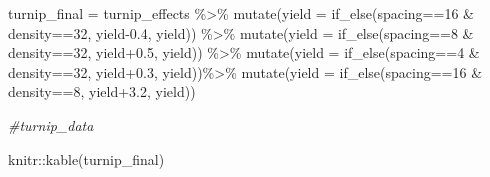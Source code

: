 \documentclass[
]{book}
\newenvironment{Shaded}{\begin{snugshade}}{\end{snugshade}}
\newcommand{\AttributeTok}[1]{\textcolor[rgb]{0.77,0.63,0.00}{#1}}
\newcommand{\CommentTok}[1]{\textcolor[rgb]{0.56,0.35,0.01}{\textit{#1}}}
\newcommand{\DecValTok}[1]{\textcolor[rgb]{0.00,0.00,0.81}{#1}}
\newcommand{\FloatTok}[1]{\textcolor[rgb]{0.00,0.00,0.81}{#1}}
\newcommand{\FunctionTok}[1]{\textcolor[rgb]{0.00,0.00,0.00}{#1}}
\newcommand{\NormalTok}[1]{#1}
\newcommand{\OtherTok}[1]{\textcolor[rgb]{0.56,0.35,0.01}{#1}}
\newcommand{\SpecialCharTok}[1]{\textcolor[rgb]{0.00,0.00,0.00}{#1}}
\begin{document}
\begin{Shaded}
\begin{Highlighting}[]
\NormalTok{turnip\_final }\OtherTok{=}\NormalTok{ turnip\_effects }\SpecialCharTok{\%\textgreater{}\%}
  \FunctionTok{mutate}\NormalTok{(}\AttributeTok{yield =} \FunctionTok{if\_else}\NormalTok{(spacing}\SpecialCharTok{==}\DecValTok{16} \SpecialCharTok{\&}\NormalTok{ density}\SpecialCharTok{==}\DecValTok{32}\NormalTok{, yield}\FloatTok{{-}0.4}\NormalTok{, yield)) }\SpecialCharTok{\%\textgreater{}\%}
  \FunctionTok{mutate}\NormalTok{(}\AttributeTok{yield =} \FunctionTok{if\_else}\NormalTok{(spacing}\SpecialCharTok{==}\DecValTok{8} \SpecialCharTok{\&}\NormalTok{ density}\SpecialCharTok{==}\DecValTok{32}\NormalTok{, yield}\FloatTok{+0.5}\NormalTok{, yield)) }\SpecialCharTok{\%\textgreater{}\%}
  \FunctionTok{mutate}\NormalTok{(}\AttributeTok{yield =} \FunctionTok{if\_else}\NormalTok{(spacing}\SpecialCharTok{==}\DecValTok{4} \SpecialCharTok{\&}\NormalTok{ density}\SpecialCharTok{==}\DecValTok{32}\NormalTok{, yield}\FloatTok{+0.3}\NormalTok{, yield))}\SpecialCharTok{\%\textgreater{}\%}
  \FunctionTok{mutate}\NormalTok{(}\AttributeTok{yield =} \FunctionTok{if\_else}\NormalTok{(spacing}\SpecialCharTok{==}\DecValTok{16} \SpecialCharTok{\&}\NormalTok{ density}\SpecialCharTok{==}\DecValTok{8}\NormalTok{, yield}\FloatTok{+3.2}\NormalTok{, yield))}

\CommentTok{\#turnip\_data}

\NormalTok{knitr}\SpecialCharTok{::}\FunctionTok{kable}\NormalTok{(turnip\_final)}
\end{Highlighting}
\end{Shaded}
\end{document}
